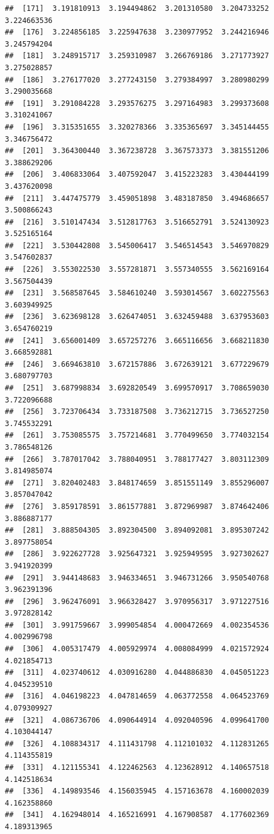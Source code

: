 \documentclass[
  11pt]{report}
\begin{document}
\begin{itemize}
\begin{verbatim}
##  [171]  3.191810913  3.194494862  3.201310580  3.204733252  3.224663536
##  [176]  3.224856185  3.225947638  3.230977952  3.244216946  3.245794204
##  [181]  3.248915717  3.259310987  3.266769186  3.271773927  3.275028857
##  [186]  3.276177020  3.277243150  3.279384997  3.280980299  3.290035668
##  [191]  3.291084228  3.293576275  3.297164983  3.299373608  3.310241067
##  [196]  3.315351655  3.320278366  3.335365697  3.345144455  3.346756472
##  [201]  3.364300440  3.367238728  3.367573373  3.381551206  3.388629206
##  [206]  3.406833064  3.407592047  3.415223283  3.430444199  3.437620098
##  [211]  3.447475779  3.459051898  3.483187850  3.494686657  3.500866243
##  [216]  3.510147434  3.512817763  3.516652791  3.524130923  3.525165164
##  [221]  3.530442808  3.545006417  3.546514543  3.546970829  3.547602837
##  [226]  3.553022530  3.557281871  3.557340555  3.562169164  3.567504439
##  [231]  3.568587645  3.584610240  3.593014567  3.602275563  3.603949925
##  [236]  3.623698128  3.626474051  3.632459488  3.637953603  3.654760219
##  [241]  3.656001409  3.657257276  3.665116656  3.668211830  3.668592881
##  [246]  3.669463810  3.672157886  3.672639121  3.677229679  3.680797703
##  [251]  3.687998834  3.692820549  3.699570917  3.708659030  3.722096688
##  [256]  3.723706434  3.733187508  3.736212715  3.736527250  3.745532291
##  [261]  3.753085575  3.757214681  3.770499650  3.774032154  3.786548126
##  [266]  3.787017042  3.788040951  3.788177427  3.803112309  3.814985074
##  [271]  3.820402483  3.848174659  3.851551149  3.855296007  3.857047042
##  [276]  3.859178591  3.861577881  3.872969987  3.874642406  3.886887177
##  [281]  3.888504305  3.892304500  3.894092081  3.895307242  3.897758054
##  [286]  3.922627728  3.925647321  3.925949595  3.927302627  3.941920399
##  [291]  3.944148683  3.946334651  3.946731266  3.950540768  3.962391396
##  [296]  3.962476091  3.966328427  3.970956317  3.971227516  3.972828142
##  [301]  3.991759667  3.999054854  4.000472669  4.002354536  4.002996798
##  [306]  4.005317479  4.005929974  4.008084999  4.021572924  4.021854713
##  [311]  4.023740612  4.030916280  4.044886830  4.045051223  4.045239510
##  [316]  4.046198223  4.047814659  4.063772558  4.064523769  4.079309927
##  [321]  4.086736706  4.090644914  4.092040596  4.099641700  4.103044147
##  [326]  4.108834317  4.111431798  4.112101032  4.112831265  4.114355819
##  [331]  4.121155341  4.122462563  4.123628912  4.140657518  4.142518634
##  [336]  4.149893546  4.156035945  4.157163678  4.160002039  4.162358860
##  [341]  4.162948014  4.165216991  4.167908587  4.177602369  4.189313965

\end{verbatim}
\end{itemize}
\end{document}
